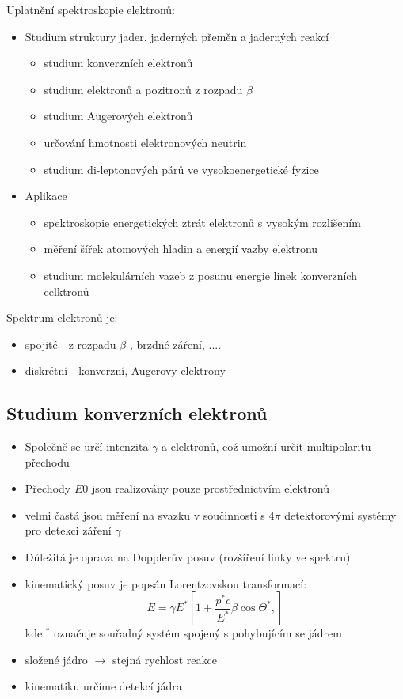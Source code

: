 \documentclass[../../main.tex]{subfiles}
\begin{document}
Uplatnění spektroskopie elektronů:
\begin{itemize}
	\item Studium struktury jader, jaderných přeměn a jaderných reakcí
	\begin{itemize}
		\item studium konverzních elektronů
		\item studium elektronů a pozitronů z rozpadu $\beta$
		\item studium Augerových elektronů
		\item určování hmotnosti elektronových neutrin
		\item studium di-leptonových párů ve vysokoenergetické fyzice	
	\end{itemize}
    \item Aplikace
    \begin{itemize}
    	\item spektroskopie energetických ztrát elektronů s vysokým rozlišením
    	\item měření šířek atomových hladin a energií vazby elektronu
    	\item studium molekulárních vazeb z posunu energie linek konverzních eelktronů
    \end{itemize} 
\end{itemize}

Spektrum elektronů je:
\begin{itemize}
	\item spojité - z rozpadu $\beta$ , brzdné záření, ....
	\item diskrétní - konverzní, Augerovy elektrony
\end{itemize}	 
 
\subsection{Studium konverzních elektronů}

\begin{itemize}
	\item Společně se určí intenzita $\gamma$ a elektronů, což umožní určit multipolaritu přechodu
	\item Přechody $E0$ jsou realizovány pouze prostřednictvím elektronů 
	\item velmi častá jsou měření na svazku v součinnosti s $4 \pi$ detektorovými systémy pro detekci záření $\gamma$
	\item Důležitá je oprava na Dopplerův posuv (rozšíření linky ve spektru)
	\item kinematický posuv je popsán Lorentzovskou transformací: 
	\begin{equation}
	E = \gamma E^* \left[ 1 + \dfrac{p^* c}{E^*} \beta \cos \Theta ^* ,\right]  
	\end{equation}
	kde $^* $ označuje souřadný systém spojený s pohybujícím se jádrem
	\item složené jádro $\rightarrow$ stejná rychlost reakce 
	\item kinematiku určíme detekcí jádra
\end{itemize}
\end{document}
